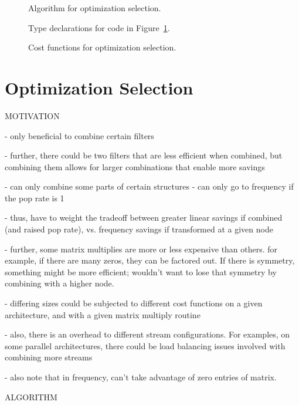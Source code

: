 \begin{figure}[t]
  \caption{Algorithm for optimization selection.
  \protect\label{fig:part-alg}}
\end{figure}

\begin{figure}[t]
  \caption{Type declarations for code in Figure~\ref{fig:part-alg}.}
\end{figure}

\begin{figure}[t]
  \caption{Cost functions for optimization selection.}
\end{figure}

\section{Optimization Selection}

MOTIVATION

- only beneficial to combine certain filters

  - further, there could be two filters that are less efficient when
    combined, but combining them allows for larger combinations that
    enable more savings

- can only combine some parts of certain structures
- can only go to frequency if the pop rate is 1

  - thus, have to weight the tradeoff between greater linear savings
    if combined (and raised pop rate), vs. frequency savings if
    transformed at a given node

- further, some matrix multiplies are more or less expensive than
  others.  for example, if there are many zeros, they can be factored
  out.  If there is symmetry, something might be more efficient;
  wouldn't want to lose that symmetry by combining with a higher node.

  - differing sizes could be subjected to different cost functions on
  a given architecture, and with a given matrix multiply routine

- also, there is an overhead to different stream configurations.  For
  examples, on some parallel architectures, there could be load
  balancing issues involved with combining more streams

- also note that in frequency, can't take advantage of zero entries of
  matrix.

ALGORITHM

